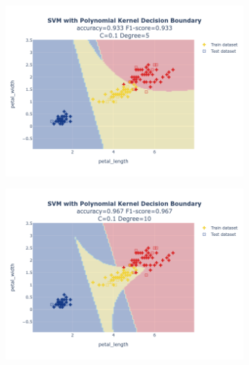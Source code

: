 \documentclass{article}
\begin{document}
\begin{figure}
\begin{subfigure}{0.3\textwidth}
        \includegraphics[scale=.13]{images/implementation/q1/polynomial_kernel/petal_length_petal_width_0.1_5.png}
    \end{subfigure}
    \hfill
    \begin{subfigure}{0.3\textwidth}
        \centering
        \includegraphics[scale=.13]{images/implementation/q1/polynomial_kernel/petal_length_petal_width_0.1_10.png}
    \end{subfigure}
    \newline
    \begin{subfigure}{0.3\textwidth}
        \centering

\end{subfigure}
\end{figure}
\end{document}
